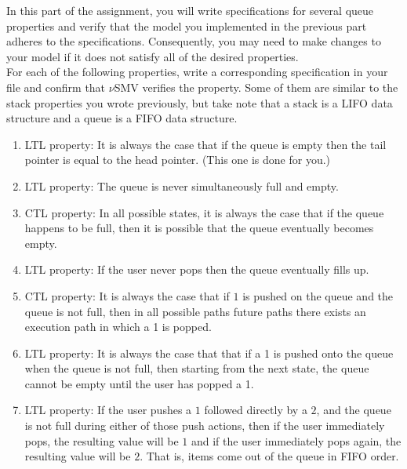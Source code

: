 \documentclass[12pt]{article}
\newenvironment{problem}[2][Problem]{\begin{trivlist}
\item[\hskip \labelsep {\bfseries #1}\hskip \labelsep {\bfseries #2.}]}{\end{trivlist}}
\begin{document}
\begin{problem}{2. Verifying properties of your queue model} In this part of the assignment, you will write specifications for several queue properties and verify that the model you implemented in the previous part adheres to the specifications. Consequently, you may need to make changes to your model if it does not satisfy all of the desired properties. \\

For each of the following properties, write a corresponding specification in your file and confirm that $\nu$SMV verifies the property. Some of them are similar to the stack properties you wrote previously, but take note that a stack is a LIFO data structure and a queue is a FIFO data structure.


\begin{enumerate}[label=\roman*.]

\item LTL property: It is always the case that if the queue is empty then the tail pointer is equal to the head pointer. (This one is done for you.)

\item LTL property: The queue is never simultaneously full and empty.

\item CTL property: In all possible states, it is always the case that if the queue happens to be full, then it is possible that the queue eventually becomes empty.

\item LTL property: If the user never pops then the queue eventually fills up.

\item CTL property: It is always the case that if $1$ is pushed on the queue and the queue is not full, then in all possible paths future paths there exists an execution path in which a 1 is popped.

\item LTL property: It is always the case that that if a 1 is pushed onto the queue when the queue is not full, then  starting from the next state, the queue cannot be empty until the user has popped a 1.

\item LTL property: If the user pushes a $1$ followed directly by a $2$, and the queue is not full during either of those push actions, then if the user immediately pops, the resulting value will be $1$ and if the user immediately pops again, the resulting value will be $2$. That is, items come out of the queue in FIFO order.

\end{enumerate}

\end{problem}
\end{document}
